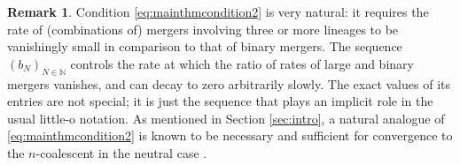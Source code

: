 \documentclass[12pt,authoryear]{article}
\theoremstyle{definition}
\newtheorem{rmk}{Remark}
\newcommand{\1}[1]{\mathbbm{1}_{#1}}
\begin{document}
\begin{rmk}
Condition \eqref{eq:mainthmcondition2} is very natural: it requires the rate of (combinations of) mergers involving three or more lineages to be vanishingly small in comparison to that of binary mergers.
The sequence $( b_N )_{ N \in \mathbb{N} }$ controls the rate at which the ratio of rates of large and binary mergers vanishes, and can decay to zero arbitrarily slowly.
The exact values of its entries are not special; it is just the sequence that plays an implicit role in the usual little-o notation.
As mentioned in Section \ref{sec:intro}, a natural analogue of \eqref{eq:mainthmcondition2} is known to be necessary and sufficient for convergence to the $n$-coalescent in the neutral case \citep[Equation (16)]{mohle2000}.
\end{rmk}
\end{document}
